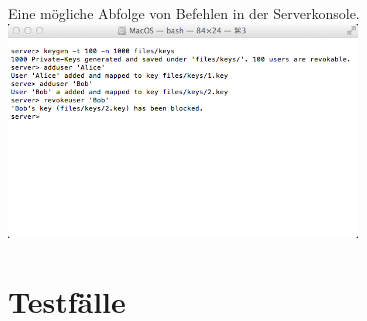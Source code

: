 \documentclass[a4paper,10pt]{scrartcl}
\begin{document}
\begin{illustration}{Eine mögliche Abfolge von Befehlen in der Serverkonsole.}
\includegraphics[width=350px]{figures/images/serverterminal.jpg}
\end{illustration}

\section{Testfälle}
\end{document}
